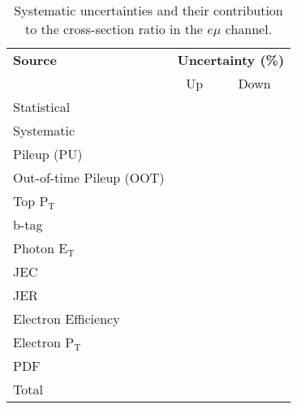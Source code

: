 \begin{table}[h!] 
\centering
\begin{tabular}{|l|c|c|}
\hline
\textbf{Source} & \multicolumn{2}{c|}{\textbf{Uncertainty (\%)}} \\ \cline{2-3}
 & Up & Down \\
\hline
Statistical & & \\
\hline
Systematic & & \\
\hline
Pileup (PU) & & \\
Out-of-time Pileup (OOT) & & \\
Top P$_{\text{T}}$ & & \\
b-tag & & \\
Photon E$_{\text{T}}$ & & \\
JEC & & \\
JER & & \\
Electron Efficiency & & \\
Electron P$_{\text{T}}$ & & \\
PDF & & \\
\hline
Total & & \\
\hline
\end{tabular} 
\caption{Systematic uncertainties and their contribution to the cross-section ratio in the $e\mu$ channel.}
\label{tab-systuncertsEMu}
\end{table}

